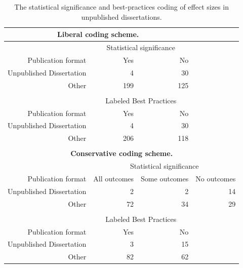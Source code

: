 \documentclass[man, mask]{apa6}
\begin{document}
\begin{table}[htbp]
	\centering
	\caption{The statistical significance and best-practices coding of effect sizes in unpublished dissertations.}
	\begin{tabular}{rrrr}
		\toprule
		\multicolumn{3}{c}{\textbf{Liberal coding scheme.}} &  \\
		\midrule
		& \multicolumn{2}{c}{Statistical significance} &  \\
		Publication format & Yes   & No    &  \\
		Unpublished Dissertation & 4     & 30    &  \\
		Other & 199   & 125   &  \\
		&       &       &  \\
		& \multicolumn{2}{c}{Labeled Best Practices} &  \\
		Publication format & Yes   & No    &  \\
		Unpublished Dissertation & 4     & 30    &  \\
		Other & 206   & 118   &  \\
		&       &       &  \\
		\multicolumn{4}{c}{\textbf{Conservative coding scheme.}} \\
		& \multicolumn{3}{c}{Statistical significance} \\
		Publication format & All outcomes   & Some outcomes & No outcomes \\
		Unpublished Dissertation & 2     & 2     & 14 \\
		Other & 72    & 34    & 29 \\
		&       &       &  \\
		& \multicolumn{2}{c}{Labeled Best Practices} &  \\
		Publication format & Yes   & No    &  \\
		Unpublished Dissertation & 3     & 15    &  \\
		Other & 82    & 62    &  \\
		\bottomrule
	\end{tabular}%
	\label{table:dissertations}%
\end{table}
\end{document}
